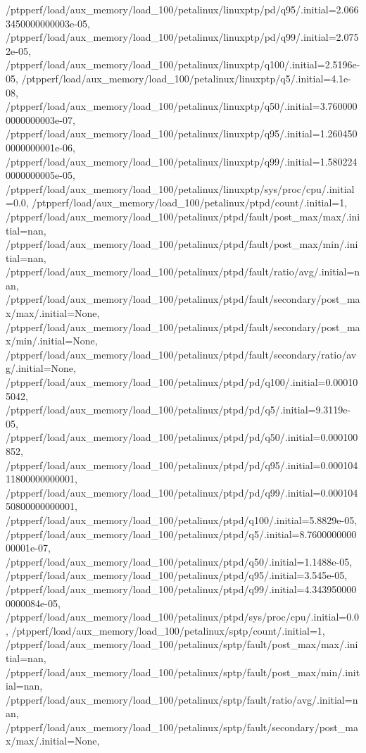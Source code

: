 {    /ptpperf/load/aux_memory/load_100/petalinux/linuxptp/pd/q95/.initial=2.0663450000000003e-05,
    /ptpperf/load/aux_memory/load_100/petalinux/linuxptp/pd/q99/.initial=2.0752e-05,
    /ptpperf/load/aux_memory/load_100/petalinux/linuxptp/q100/.initial=2.5196e-05,
    /ptpperf/load/aux_memory/load_100/petalinux/linuxptp/q5/.initial=4.1e-08,
    /ptpperf/load/aux_memory/load_100/petalinux/linuxptp/q50/.initial=3.7600000000000003e-07,
    /ptpperf/load/aux_memory/load_100/petalinux/linuxptp/q95/.initial=1.2604500000000001e-06,
    /ptpperf/load/aux_memory/load_100/petalinux/linuxptp/q99/.initial=1.5802240000000005e-05,
    /ptpperf/load/aux_memory/load_100/petalinux/linuxptp/sys/proc/cpu/.initial=0.0,
    /ptpperf/load/aux_memory/load_100/petalinux/ptpd/count/.initial=1,
    /ptpperf/load/aux_memory/load_100/petalinux/ptpd/fault/post_max/max/.initial=nan,
    /ptpperf/load/aux_memory/load_100/petalinux/ptpd/fault/post_max/min/.initial=nan,
    /ptpperf/load/aux_memory/load_100/petalinux/ptpd/fault/ratio/avg/.initial=nan,
    /ptpperf/load/aux_memory/load_100/petalinux/ptpd/fault/secondary/post_max/max/.initial=None,
    /ptpperf/load/aux_memory/load_100/petalinux/ptpd/fault/secondary/post_max/min/.initial=None,
    /ptpperf/load/aux_memory/load_100/petalinux/ptpd/fault/secondary/ratio/avg/.initial=None,
    /ptpperf/load/aux_memory/load_100/petalinux/ptpd/pd/q100/.initial=0.000105042,
    /ptpperf/load/aux_memory/load_100/petalinux/ptpd/pd/q5/.initial=9.3119e-05,
    /ptpperf/load/aux_memory/load_100/petalinux/ptpd/pd/q50/.initial=0.000100852,
    /ptpperf/load/aux_memory/load_100/petalinux/ptpd/pd/q95/.initial=0.00010411800000000001,
    /ptpperf/load/aux_memory/load_100/petalinux/ptpd/pd/q99/.initial=0.00010450800000000001,
    /ptpperf/load/aux_memory/load_100/petalinux/ptpd/q100/.initial=5.8829e-05,
    /ptpperf/load/aux_memory/load_100/petalinux/ptpd/q5/.initial=8.760000000000001e-07,
    /ptpperf/load/aux_memory/load_100/petalinux/ptpd/q50/.initial=1.1488e-05,
    /ptpperf/load/aux_memory/load_100/petalinux/ptpd/q95/.initial=3.545e-05,
    /ptpperf/load/aux_memory/load_100/petalinux/ptpd/q99/.initial=4.3439500000000084e-05,
    /ptpperf/load/aux_memory/load_100/petalinux/ptpd/sys/proc/cpu/.initial=0.0,
    /ptpperf/load/aux_memory/load_100/petalinux/sptp/count/.initial=1,
    /ptpperf/load/aux_memory/load_100/petalinux/sptp/fault/post_max/max/.initial=nan,
    /ptpperf/load/aux_memory/load_100/petalinux/sptp/fault/post_max/min/.initial=nan,
    /ptpperf/load/aux_memory/load_100/petalinux/sptp/fault/ratio/avg/.initial=nan,
    /ptpperf/load/aux_memory/load_100/petalinux/sptp/fault/secondary/post_max/max/.initial=None,
}
